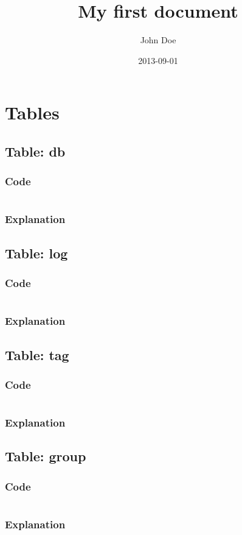 \documentclass{report}
\title{My first document}
\date{2013-09-01}
\author{John Doe}
\begin{document}
\newcommand{\printSQLtest}[1]
{
	\inputminted[linenos, breaklines, breakbytoken, tabsize=4]{mysql}{#1}
}

\newcommand{\printSQLTablepage}[2]
{
	\section{Table: #2}
	\subsection{Code}
	\printSQLtest{../sql/parts/#1}
	\subsection{Explanation}
	\lipsum[1-2]
	\newpage

}




	\maketitle
	\newpage

	\tableofcontents{}
	\newpage
	
	\chapter{Tables}
	\newpage


	\printSQLTablepage{00_db.sql}{db}
	\printSQLTablepage{01_tblLog.sql}{log}
	\printSQLTablepage{02_tblTag.sql}{tag}
	\printSQLTablepage{03_tblGroup.sql}{group}
\end{document}
